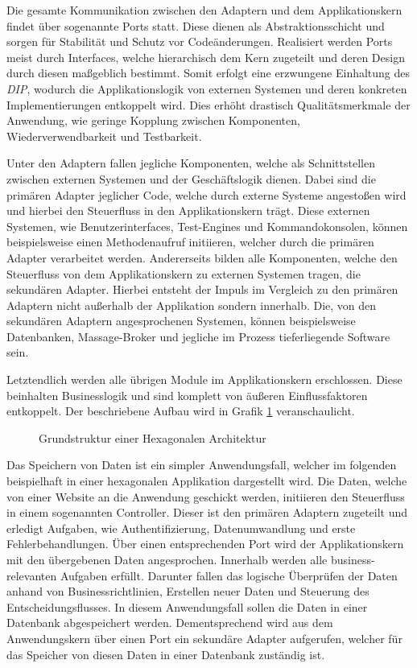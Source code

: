 Die gesamte Kommunikation zwischen den Adaptern und dem Applikationskern findet über sogenannte Ports statt. Diese dienen als Abstraktionsschicht und sorgen für Stabilität und Schutz vor Codeänderungen. Realisiert werden Ports meist durch Interfaces, welche hierarchisch dem Kern zugeteilt und deren Design durch diesen maßgeblich bestimmt. Somit erfolgt eine erzwungene Einhaltung des \emph{\acrlong{DIP}}, wodurch die Applikationslogik von externen Systemen und deren konkreten Implementierungen entkoppelt wird. Dies erhöht drastisch Qualitätsmerkmale der Anwendung, wie geringe Kopplung zwischen Komponenten, Wiederverwendbarkeit und Testbarkeit.

Unter den Adaptern fallen jegliche Komponenten, welche als Schnittstellen zwischen externen Systemen und der Geschäftslogik dienen. Dabei sind die primären Adapter jeglicher Code, welche durch externe Systeme angestoßen wird und hierbei den Steuerfluss in den Applikationskern trägt. Diese externen Systemen, wie Benutzerinterfaces, Test-Engines und Kommandokonsolen, können beispielsweise einen Methodenaufruf initiieren, welcher durch die primären Adapter verarbeitet werden. Andererseits bilden alle Komponenten, welche den Steuerfluss von dem Applikationskern zu externen Systemen tragen, die sekundären Adapter. Hierbei entsteht der Impuls im Vergleich zu den primären Adaptern nicht außerhalb der Applikation sondern innerhalb. Die, von den sekundären Adaptern angesprochenen Systemen, können beispielsweise Datenbanken, Massage-Broker und jegliche im Prozess tieferliegende Software sein. 

Letztendlich werden alle übrigen Module im Applikationskern erschlossen. Diese beinhalten Businesslogik und sind komplett von äußeren Einflussfaktoren entkoppelt. Der beschriebene Aufbau wird in Grafik \ref{fig:HexagonaleArchitektur} veranschaulicht.

\begin{figure}[htbp]
	\centering
	
	\caption{Grundstruktur einer Hexagonalen Architektur}
	\label{fig:HexagonaleArchitektur}
\end{figure}

Das Speichern von Daten ist ein simpler Anwendungsfall, welcher im folgenden beispielhaft in einer hexagonalen Applikation dargestellt wird. Die Daten, welche von einer Website an die Anwendung geschickt werden, initiieren den Steuerfluss in einem sogenannten Controller. Dieser ist den primären Adaptern zugeteilt und erledigt Aufgaben, wie Authentifizierung, Datenumwandlung und erste Fehlerbehandlungen. Über einen entsprechenden Port wird der Applikationskern mit den übergebenen Daten angesprochen. Innerhalb werden alle business-relevanten Aufgaben erfüllt. Darunter fallen das logische Überprüfen der Daten anhand von Businessrichtlinien, Erstellen neuer Daten und Steuerung des Entscheidungsflusses. In diesem Anwendungsfall sollen die Daten in einer Datenbank abgespeichert werden. Dementsprechend wird aus dem Anwendungskern über einen Port ein sekundäre Adapter aufgerufen, welcher für das Speicher von diesen Daten in einer Datenbank zuständig ist.

